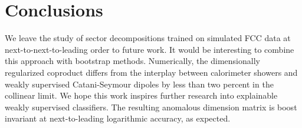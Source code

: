 \section{Conclusions}\label{sec:conclusions}

We leave the study of sector decompositions trained on simulated FCC
data at next-to-next-to-leading order to future work. It would be
interesting to combine this approach with bootstrap methods.
Numerically, the dimensionally regularized coproduct differs from the
interplay between calorimeter showers and weakly supervised
Catani-Seymour dipoles by less than two percent in the collinear limit.
We hope this work inspires further research into explainable weakly
supervised classifiers. The resulting anomalous dimension matrix is
boost invariant at next-to-leading logarithmic accuracy, as expected.

